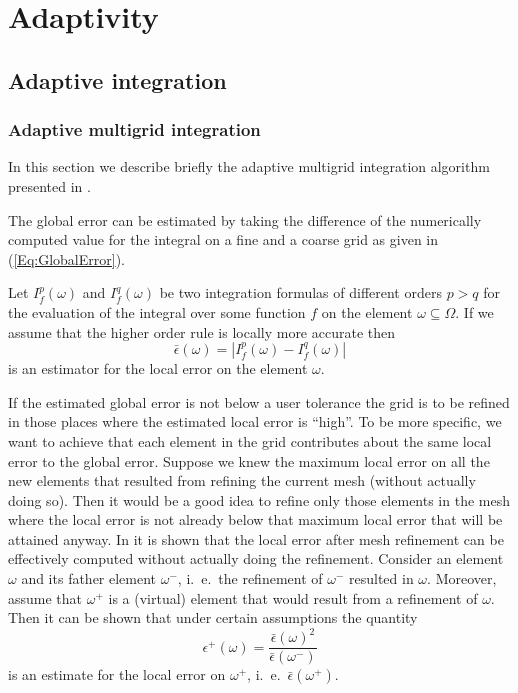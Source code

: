 \documentclass[11pt,a4paper,headinclude,footinclude,DIV16,normalheadings]{scrreprt}
\begin{document}
\chapter{Adaptivity}

\section{Adaptive integration}

\subsection{Adaptive multigrid integration}

In this section we describe briefly the adaptive multigrid integration
algorithm presented in \cite{Deuflhard93}.


The global error can be estimated by taking the difference of the numerically
computed value for the integral on a fine and a coarse grid as given in
(\ref{Eq:GlobalError}). 


Let $I_f^p(\omega)$ and $I_f^q(\omega)$ be two integration formulas of
different orders $p>q$ for the evaluation of the integral over some
function $f$ on the element $\omega\subseteq\Omega$. If we assume that
the higher order rule is locally more accurate then 
\begin{equation}
\bar{\epsilon}(\omega) = |I_f^p(\omega)-I_f^q(\omega)|
\end{equation}
is an estimator for the local error on the element $\omega$.


If the estimated global error is not below a user tolerance the grid
is to be refined in those places where the estimated local error is
``high''. To be more specific, we want to achieve that each element in
the grid contributes about the same local error to the global
error. Suppose we knew the maximum local error on all the new elements
that resulted from refining the current mesh (without actually doing
so). Then it would be a good idea to refine only those elements in the
mesh where the local error is not already below that maximum local
error that will be attained anyway.
In \cite{Deuflhard93} it is shown that the local error after mesh
refinement can be effectively computed without actually doing the
refinement. Consider an element $\omega$ and its father element
$\omega^-$, i.~e.~the refinement of  $\omega^-$ resulted in
$\omega$. Moreover, assume that $\omega^+$ is a (virtual) element that
would result from a refinement of $\omega$. Then it can be shown that 
under certain assumptions the quantity
\begin{equation}
\epsilon^+(\omega) = \frac{\bar{\epsilon}(\omega)^2}{\bar{\epsilon}(\omega^-)}
\end{equation}
is an estimate for the local error on $\omega^+$,
i.~e.~$\bar{\epsilon}(\omega^+)$. 
\end{document}
